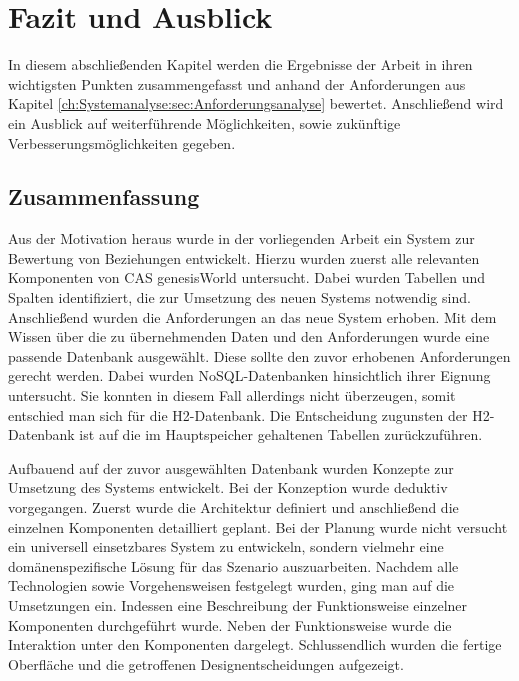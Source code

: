 
\chapter{Fazit und Ausblick}
\label{ch:Ergebnis}

In diesem abschließenden Kapitel werden die Ergebnisse der Arbeit in ihren wichtigsten Punkten zusammengefasst und anhand der Anforderungen aus Kapitel \ref{ch:Systemanalyse:sec:Anforderungsanalyse} bewertet. Anschließend wird ein Ausblick auf weiterführende Möglichkeiten, sowie zukünftige Verbesserungsmöglichkeiten gegeben. 

\section{Zusammenfassung}
\label{ch:Ergebnis:sec:zusammenfassung}

Aus der Motivation heraus wurde in der vorliegenden Arbeit ein System zur Bewertung von Beziehungen entwickelt. Hierzu wurden zuerst alle relevanten Komponenten von CAS genesisWorld untersucht. Dabei wurden Tabellen und Spalten identifiziert, die zur Umsetzung des neuen Systems notwendig sind. Anschließend wurden die Anforderungen an das neue System erhoben. Mit dem Wissen über die zu übernehmenden Daten und den Anforderungen wurde eine passende Datenbank ausgewählt. Diese sollte den zuvor erhobenen Anforderungen gerecht werden. Dabei wurden NoSQL-Datenbanken hinsichtlich ihrer Eignung untersucht. Sie konnten in diesem Fall allerdings nicht überzeugen, somit entschied man sich für die H2-Datenbank. Die Entscheidung zugunsten der H2-Datenbank ist auf die im Hauptspeicher gehaltenen Tabellen zurückzuführen.   

Aufbauend auf der zuvor ausgewählten Datenbank wurden Konzepte zur Umsetzung des Systems entwickelt. Bei der Konzeption wurde deduktiv vorgegangen. Zuerst wurde die Architektur definiert und anschließend die einzelnen Komponenten detailliert geplant. Bei der Planung wurde nicht versucht ein universell einsetzbares System zu entwickeln, sondern vielmehr eine domänenspezifische Lösung für das Szenario auszuarbeiten. Nachdem alle Technologien sowie Vorgehensweisen festgelegt wurden, ging man auf die Umsetzungen ein. Indessen eine Beschreibung der Funktionsweise einzelner Komponenten durchgeführt wurde. Neben der Funktionsweise wurde die Interaktion unter den Komponenten dargelegt. Schlussendlich wurden die fertige Oberfläche und die getroffenen Designentscheidungen aufgezeigt.
 
